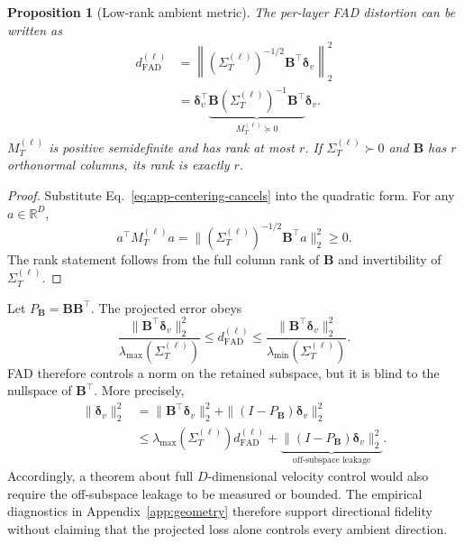 \documentclass{article}
\newcommand{\R}{\mathbb{R}}
\newcommand{\FAD}{\mathrm{FAD}}
\newcommand{\bB}{\boldsymbol{B}}
\newcommand{\bSigma}{\varSigma}
\newcommand{\bI}{I}
\theoremstyle{plain}
\newtheorem{proposition}[theorem]{Proposition}
\theoremstyle{definition}
\theoremstyle{remark}
\begin{document}
\begin{proposition}[Low-rank ambient metric]
\label{prop:app-ambient-metric}
The per-layer FAD distortion can be written as
\begin{equation}
\begin{aligned}
  d_{\FAD}^{(\ell)}
  &=\left\|(\bSigma_T^{(\ell)})^{-1/2}
  \bB^\top\boldsymbol\delta_v\right\|_2^2\\
  &=\boldsymbol\delta_v^\top
  \underbrace{\bB(\bSigma_T^{(\ell)})^{-1}\bB^\top}
  _{M_T^{(\ell)}\succeq0}
  \boldsymbol\delta_v.
  \label{eq:app-ambient-mahalanobis}
\end{aligned}
\end{equation}
$M_T^{(\ell)}$ is positive semidefinite and has rank at most $r$.  If
$\bSigma_T^{(\ell)}\succ0$ and $\bB$ has $r$ orthonormal columns, its rank is
exactly $r$.
\end{proposition}

\begin{proof}
Substitute Eq.~\eqref{eq:app-centering-cancels} into the quadratic form.  For any
$a\in\R^D$,
\begin{equation*}
  a^\top M_T^{(\ell)}a
  =\|(\bSigma_T^{(\ell)})^{-1/2}\bB^\top a\|_2^2\ge0.
\end{equation*}
The rank statement follows from the full column rank of $\bB$ and invertibility of
$\bSigma_T^{(\ell)}$.
\end{proof}

Let $P_{\bB}=\bB\bB^\top$.  The projected error obeys
\begin{equation}
  \frac{\|\bB^\top\boldsymbol\delta_v\|_2^2}
  {\lambda_{\max}(\bSigma_T^{(\ell)})}
  \le d_{\FAD}^{(\ell)}
  \le
  \frac{\|\bB^\top\boldsymbol\delta_v\|_2^2}
  {\lambda_{\min}(\bSigma_T^{(\ell)})}.
  \label{eq:app-projected-norm-equivalence}
\end{equation}
FAD therefore controls a norm on the retained subspace, but it is blind to the
nullspace of $\bB^\top$.  More precisely,
\begin{equation}
\begin{aligned}
  \|\boldsymbol\delta_v\|_2^2
  &=\|\bB^\top\boldsymbol\delta_v\|_2^2
  +\|(\bI-P_{\bB})\boldsymbol\delta_v\|_2^2\\
  &\le\lambda_{\max}(\bSigma_T^{(\ell)})d_{\FAD}^{(\ell)}
  +\underbrace{\|(\bI-P_{\bB})\boldsymbol\delta_v\|_2^2}
  _{\text{off-subspace leakage}}.
  \label{eq:app-full-error-decomposition}
\end{aligned}
\end{equation}
Accordingly, a theorem about full $D$-dimensional velocity control would also
require the off-subspace leakage to be measured or bounded.  The empirical
diagnostics in Appendix~\ref{app:geometry} therefore support directional fidelity
without claiming that the projected loss alone controls every ambient direction.
\end{document}
